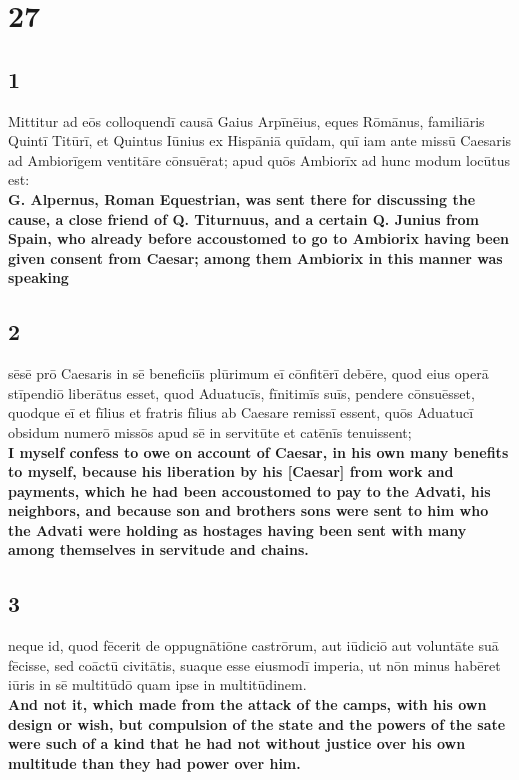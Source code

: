 \documentclass{article}
\begin{document}
\section*{27}
\subsection*{1}
Mittitur ad eōs colloquendī causā Gaius Arpīnēius, eques Rōmānus, familiāris Quintī Titūrī, et Quintus Iūnius ex Hispāniā quīdam, quī iam ante missū Caesaris ad Ambiorīgem ventitāre cōnsuērat; apud quōs Ambiorīx ad hunc modum locūtus est:\\
\textbf{G. Alpernus, Roman Equestrian, was sent there for discussing the cause, a close friend of Q. Titurnuus, and a certain Q. Junius from Spain, who already before accoustomed to go to Ambiorix having been given consent from Caesar; among them Ambiorix in this manner was speaking}

\subsection*{2}
sēsē prō Caesaris in sē beneficiīs plūrimum eī cōnfitērī debēre, quod eius operā stīpendiō liberātus esset, quod Aduatucīs, fīnitimīs suīs, pendere cōnsuēsset, quodque eī et fīlius et fratris fīlius ab Caesare remissī essent, quōs Aduatucī obsidum numerō missōs apud sē in servitūte et catēnīs tenuissent; \\
\textbf{ I myself confess to owe on account of Caesar, in his own many benefits to myself, because his liberation by his [Caesar] from work and payments, which he had been accoustomed to pay to the Advati, his neighbors, and because son and brothers sons were sent to him who the Advati were holding as hostages having been sent with many among themselves in servitude and chains.}

\subsection*{3}
neque id, quod fēcerit de oppugnātiōne castrōrum, aut iūdiciō aut voluntāte suā fēcisse, sed coāctū civitātis, suaque esse eiusmodī imperia, ut nōn minus habēret iūris in sē multitūdō quam ipse in multitūdinem.\\
\textbf{And not it, which made from the attack of the camps, with his own design or wish, but compulsion of the state and the powers of the sate were such of a kind that he had not without justice over his own multitude than they had power over him.}
\end{document}
